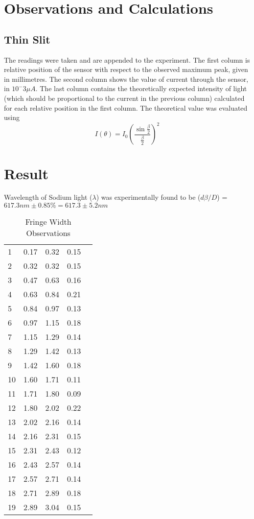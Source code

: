 \section{Observations and Calculations}	
	\subsection{Thin Slit}
	The readings were taken and are appended to the experiment. The first column is relative position of the sensor with respect to the observed maximum peak, given in millimetres. The second column shows the value of current through the sensor, in $10^-3 \mu A$. The last column contains the theoretically expected intensity of light (which should be proportional to the current in the previous column) calculated for each relative position in the first column. The theoretical value was evaluated using
	\begin{equation}
		I(\theta) = I_0(\frac{\sin{\frac{\beta}{2}}}{\frac{\beta}{2}})^2
	\end{equation}
\section{Result}
	Wavelength of Sodium light ($\lambda$) was experimentally found to be ($d\beta /D$) = $617.3 nm \pm 0.85\% = 617.3 \pm 5.2 nm$

	\begin{table}
		\myfloatalign
		\begin{tabularx}{\textwidth}{Xllll}
			\hline
			\tableheadline{Serial} 	&	\tableheadline{Initial Screw Position} & \tableheadline{Final Screw Position} & \tableheadline{Fringe Width}\\
			\hline
				1	&	0.17	&	0.32	&	0.15\\
				2	&	0.32	&	0.32	&	0.15\\
				3	&	0.47	&	0.63	&	0.16\\
				4	&	0.63	&	0.84	&	0.21\\
				5	&	0.84	&	0.97	&	0.13\\
				6	&	0.97	&	1.15	&	0.18\\
				7	&	1.15	&	1.29	&	0.14\\
				8	&	1.29	&	1.42	&	0.13\\
				9	&	1.42	&	1.60	&	0.18\\
				10	&	1.60	&	1.71	&	0.11\\
				11	&	1.71	&	1.80	&	0.09\\
				12	&	1.80	&	2.02	&	0.22\\
				13	&	2.02	&	2.16	&	0.14\\
				14	&	2.16	&	2.31	&	0.15\\
				15	&	2.31	&	2.43	&	0.12\\
				16	&	2.43	&	2.57	&	0.14\\
				17	&	2.57	&	2.71	&	0.14\\
				18	&	2.71	&	2.89	&	0.18\\
				19	&	2.89	&	3.04	&	0.15\\
			\hline
		\end{tabularx}
		\caption{Fringe Width Observations}
		\label{E2_observations}
	\end{table}

